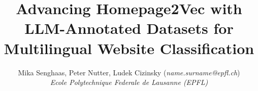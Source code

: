 \documentclass{article}
\begin{document}
\thispagestyle{empty} 

\title{
  Advancing Homepage2Vec with LLM-Annotated Datasets for Multilingual Website Classification
}

\author{
  Mika Senghaas, Peter Nutter, Ludek Cizinsky (\textit{name.surname@epfl.ch}) \\[0.5em]
  \textit{Ecole Polytechnique Federale de Lausanne (EPFL)}\\
}
\maketitle








\newpage



\newpage
\appendix


\end{document}
